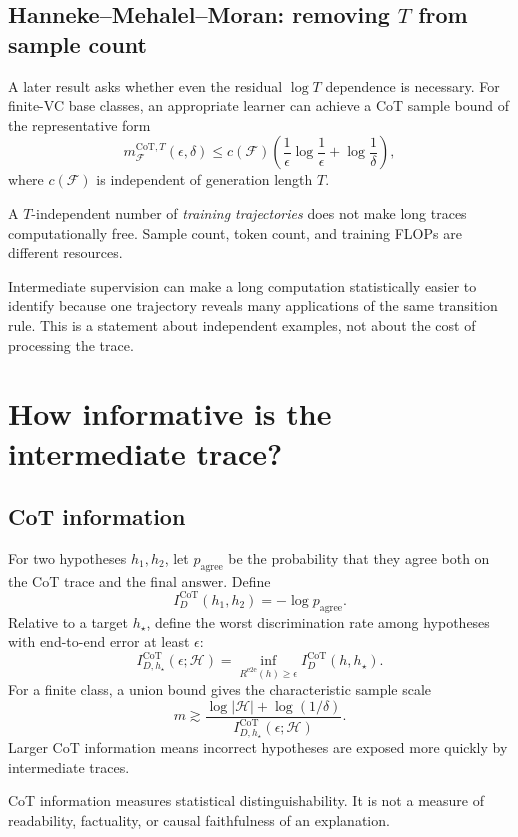 \documentclass[11pt,a4paper,oneside,openany]{memoir}
\theoremstyle{definition}
\begin{document}
\section{Hanneke--Mehalel--Moran: removing $T$ from sample count}
A later result asks whether even the residual $\log T$ dependence is necessary.  For finite-VC base classes, an appropriate learner can achieve a CoT sample bound of the representative form
\[
\boxed{
m^{\mathrm{CoT},T}_{\mathcal F}(\epsilon,\delta)
\le c(\mathcal F)
\left(
\frac1\epsilon\log\frac1\epsilon+
\log\frac1\delta
\right),}
\]
where $c(\mathcal F)$ is independent of generation length $T$.

\begin{keybox}
A $T$-independent number of \emph{training trajectories} does not make long traces computationally free.  Sample count, token count, and training FLOPs are different resources.
\end{keybox}

\begin{presentbox}
Intermediate supervision can make a long computation statistically easier to identify because one trajectory reveals many applications of the same transition rule.  This is a statement about independent examples, not about the cost of processing the trace.
\end{presentbox}

\chapter{How informative is the intermediate trace?}
\section{CoT information}
For two hypotheses $h_1,h_2$, let $p_{\mathrm{agree}}$ be the probability that they agree both on the CoT trace and the final answer.  Define
\[
I_D^{\mathrm{CoT}}(h_1,h_2)=-\log p_{\mathrm{agree}}.
\]
Relative to a target $h_\star$, define the worst discrimination rate among hypotheses with end-to-end error at least $\epsilon$:
\[
I_{D,h_\star}^{\mathrm{CoT}}(\epsilon;\mathcal H)
=\inf_{R^{\mathrm{e2e}}(h)\ge\epsilon}
I_D^{\mathrm{CoT}}(h,h_\star).
\]
For a finite class, a union bound gives the characteristic sample scale
\[
\boxed{
m\gtrsim
\frac{\log|\mathcal H|+\log(1/\delta)}
{I_{D,h_\star}^{\mathrm{CoT}}(\epsilon;\mathcal H)}.}
\]
Larger CoT information means incorrect hypotheses are exposed more quickly by intermediate traces.

\begin{warningbox}
CoT information measures statistical distinguishability.  It is not a measure of readability, factuality, or causal faithfulness of an explanation.
\end{warningbox}
\end{document}
